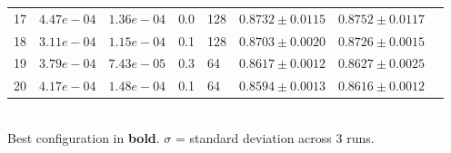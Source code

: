 \begin{table}[H]
\begin{tabular}{clllllll}
17 & $4.47e-04$ & $1.36e-04$ & 0.0 & 128 & $0.8732 \pm 0.0115$ & $0.8752 \pm 0.0117$ \\
18 & $3.11e-04$ & $1.15e-04$ & 0.1 & 128 & $0.8703 \pm 0.0020$ & $0.8726 \pm 0.0015$ \\
19 & $3.79e-04$ & $7.43e-05$ & 0.3 & 64 & $0.8617 \pm 0.0012$ & $0.8627 \pm 0.0025$ \\
20 & $4.17e-04$ & $1.48e-04$ & 0.1 & 64 & $0.8594 \pm 0.0013$ & $0.8616 \pm 0.0012$ \\
\bottomrule
\end{tabular}
\\[4pt]\footnotesize Best configuration in \textbf{bold}. $\sigma$ = standard deviation across 3 runs.
\end{table}
